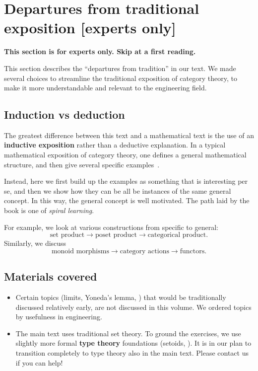 
\section[Departures from tradition]{Departures from traditional exposition [experts only]}

\textbf{This section is for experts only.
    Skip at a first reading.
}

This section describes the ``departures from tradition'' in our text.
We made several choices to streamline the traditional exposition of category theory, to make it more understandable and relevant to the engineering field.

\subsection{Induction vs deduction}

The greatest difference between this text and a mathematical text is the use of an \textbf{inductive exposition} rather than a deductive explanation.
In a typical mathematical exposition of category theory, one defines a general mathematical structure, and then give several specific examples~\cite{riehl2017category}.

Instead, here we first build up the examples as something that is interesting per se, and then we show how they can be all be instances of the same general concept.
In this way, the general concept is well motivated.
The path laid by the book is one of \emph{spiral learning}.

For example, we look at various constructions from specific to general:
%
\begin{equation}
    \text{set product} \rightarrow \text{poset product} \rightarrow \text{categorical product}.
\end{equation}
%
Similarly, we discuss
%
\begin{equation}
    \text{monoid morphisms} \rightarrow \text{category actions} \rightarrow \text{functors}.
\end{equation}

\subsection{Materials covered}
\begin{itemize}
    \item Certain topics (limits, Yoneda's lemma, \etc) that would be traditionally discussed relatively early, are not discussed in this volume.
          We ordered topics by usefulness in engineering.

    \item The main text uses traditional set theory.
          To ground the exercises, we use slightly more formal \textbf{type theory} foundations (setoids, \etc).
          It is in our plan to transition completely to type theory also in the main text.
          Please contact us if you can help!

\end{itemize}


